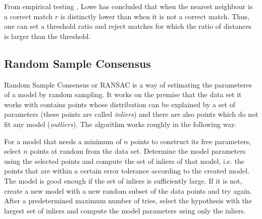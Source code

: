 From empirical testing \cite{Lowe04distinctiveimage}, Lowe has concluded that when the nearest neighbour is a correct match $r$ is distinctly lower than when it is not a correct match. Thus, one can set a threshold ratio and reject matches for which the ratio of distances is larger than the threshold.


\subsection{Random Sample Consensus}

Random Sample Consensus or RANSAC \cite{fischler1981random} is a way of estimating the parameteres of a model by random sampling. It works on the premise that the data set it works with contains points whose distribution can be explained by a set of parameters (these points are called \emph{inliers}) and there are also points which do not fit any model (\emph{outliers}). The algorithm works roughly in the following way.

For a model that needs a minimum of $n$ points to construct its free parameters, select $n$ points at random from the data set. Determine the model parameters using the selected points and compute the set of inliers of that model, i.e. the points that are within a certain error tolerance according to the created model. The model is good enough if the set of inliers is sufficiently large. If it is not, create a new model with a new random subset of the data points and try again. After a predetermined maximum number of tries, select the hypothesis with the largest set of inliers and compute the model parameters using only the inliers.

